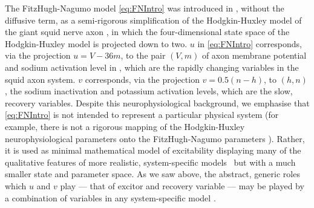 The FitzHugh-Nagumo model \eqref{eq:FNIntro} was introduced in \citep{FitzHugh1961}, without the diffusive term, as a semi-rigorous simplification of the Hodgkin-Huxley model of the giant squid nerve axon \citep{HH}, in which the four-dimensional state space of the Hodgkin-Huxley model is projected down to two. $u$ in \eqref{eq:FNIntro} corresponds, via the projection $u = V-36m$, to the pair $(V,m)$ of axon membrane potential and sodium activation level in \citep{HH}, which are the rapidly changing variables in the squid axon system. $v$ corresponds, via the projection $v = 0.5(n-h)$, to $(h,n)$, the sodium inactivation and potassium activation levels, which are the slow, recovery variables. Despite this neurophysiological background, we emphasise that \eqref{eq:FNIntro} is not intended to represent a particular physical system (for example, there is not a rigorous mapping of the Hodgkin-Huxley neurophysiological parameters onto the FitzHugh-Nagumo parameters \citep{FitzHugh1961}). Rather, it is used as minimal mathematical model of excitability displaying many of the qualitative features of more realistic, system-specific models~\citep{HH} but with a much smaller state and parameter space. As we saw above, the abstract, generic roles which $u$ and $v$ play --- that of excitor and recovery variable --- may be played by a combination of variables in any system-specific model \citep{HH,Steinbock2006,Azhand2014}. 
